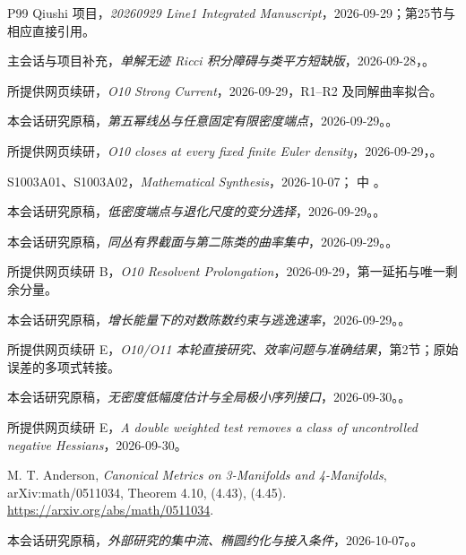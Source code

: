 \documentclass[UTF8,11pt,openany,oneside,fontset=none]{ctexbook}
\begin{document}
\begin{thebibliography}{P99}
\small
{} Qiushi 项目，\emph{20260929 Line1 Integrated Manuscript}，2026-09-29；第25节与相应直接引用。

 主会话与项目补充，\emph{单解无迹 Ricci 积分障碍与类平方短缺版}，2026-09-28，。

 所提供网页续研，\emph{O10 Strong Current}，2026-09-29，R1--R2 及同解曲率拟合。

 本会话研究原稿，\emph{第五幂线丛与任意固定有限密度端点}，2026-09-29。。

 所提供网页续研，\emph{O10 closes at every fixed finite Euler density}，2026-09-29，。

 S1003A01、S1003A02，\emph{Mathematical Synthesis}，2026-10-07； 中 。

 本会话研究原稿，\emph{低密度端点与退化尺度的变分选择}，2026-09-29。。

 本会话研究原稿，\emph{同丛有界截面与第二陈类的曲率集中}，2026-09-29。。

 所提供网页续研 B，\emph{O10 Resolvent Prolongation}，2026-09-29，第一延拓与唯一剩余分量。

 本会话研究原稿，\emph{增长能量下的对数陈数约束与逃逸速率}，2026-09-29。。

 所提供网页续研 E，\emph{O10/O11 本轮直接研究、效率问题与准确结果}，第2节；原始误差的多项式转接。

 本会话研究原稿，\emph{无密度低幅度估计与全局极小序列接口}，2026-09-30。。

 所提供网页续研 E，\emph{A double weighted test removes a class of uncontrolled negative Hessians}，2026-09-30。

 M. T. Anderson, \emph{Canonical Metrics on 3-Manifolds and 4-Manifolds}, arXiv:math/0511034, Theorem 4.10, (4.43), (4.45). \url{https://arxiv.org/abs/math/0511034}.

 本会话研究原稿，\emph{外部研究的集中流、椭圆约化与接入条件}，2026-10-07。。


\end{thebibliography}
\end{document}

